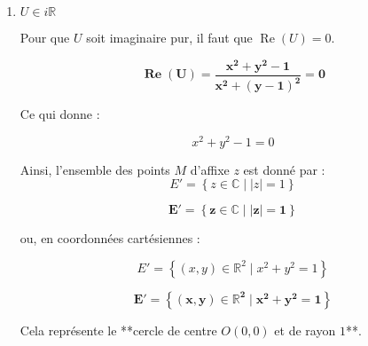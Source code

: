 \documentclass[a4paper,12pt]{article}
\begin{document}
\begin{enumerate}
\begin{enumerate}
\begin{center}
\end{center}
        \item $U \in i\mathbb{R}$

    Pour que \( U \) soit imaginaire pur, il faut que \( \operatorname{Re}(U) = 0 \).

\begin{resultbox}
    \[
    \mathbf{\operatorname{Re}(U) = \frac{x^2 + y^2 - 1}{x^2 + (y - 1)^2} = 0}
    \]
\end{resultbox}

    Ce qui donne :

    \[
    x^2 + y^2 - 1 = 0
    \]

    Ainsi, l'ensemble des points \( M \) d'affixe \( z \) est donné par :
    \[ E' = \left\{ z \in \mathbb{C} \mid |z| = 1 \right\} \]

\begin{resultbox}
    \[
    \mathbf{ E' = \left\{ z \in \mathbb{C} \mid |z| = 1 \right\}}
    \]
\end{resultbox}

    ou, en coordonnées cartésiennes :

    \[
    E' = \left\{ (x, y) \in \mathbb{R}^2 \mid x^2 + y^2 = 1 \right\}
    \]
\begin{resultbox}
    \[
    \mathbf{ E' = \left\{ (x, y) \in \mathbb{R}^2 \mid x^2 + y^2 = 1 \right\}}
    \]
\end{resultbox}
    Cela représente le **cercle de centre \( O(0,0) \) et de rayon \( 1 \)**.

\end{enumerate}


\end{enumerate}
\end{document}
